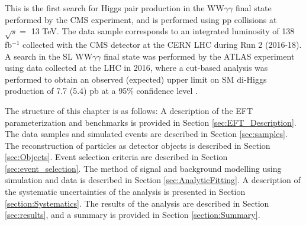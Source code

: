 This is the first search for Higgs pair production in the WW$\gamma\gamma$ final state performed by the CMS experiment, and is performed using pp collisions at $\sqrt{s} = $ 13 TeV.
The data sample corresponds to an integrated luminosity of 138 \unit{fb}$^{-1}$ collected with the CMS detector at the CERN LHC during Run 2 (2016-18).
A search in the SL WW$\gamma\gamma$ final state was performed 
by the ATLAS experiment using data collected at the LHC in 2016, where a cut-based analysis was performed to obtain an observed (expected) upper limit on SM di-Higgs
production of 7.7 (5.4) pb at a 95\% confidence level \cite{Aaboud2018}. 

The structure of this chapter is as follows: A description of the EFT parameterization and
benchmarks is provided in Section \ref{sec:EFT_Description}. The data samples and simulated events are described in Section \ref{sec:samples}. 
The reconstruction of particles as detector objects is described in Section \ref{sec:Objects}. Event selection criteria are described in Section \ref{sec:event_selection}. 
The method of signal and background modelling using simulation and data is
described in Section \ref{sec:AnalyticFitting}. A description of the systematic uncertainties of the analysis is presented in Section \ref{section:Systematics}.
The results of the analysis are described in Section \ref{sec:results}, and a summary is provided in Section \ref{section:Summary}. 
